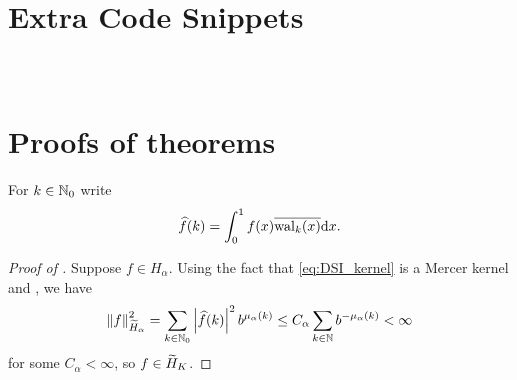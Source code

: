 \documentclass[acmsmall]{acmart}
\begin{document}
\appendix 

\section{Extra Code Snippets} \label{appendix:codes}

\begin{listing}[H]
    \inputminted{python}{snippets/genz_ex_2.txt}
    \caption{Adaptive randomized QMC approximation and error estimation.}
    \label{code:genz_ex_2}
\end{listing}

\begin{listing}[H]
    \inputminted{python}{snippets/dsi_dnet_1.txt}
    \caption{Efficient Gram matrix multiplication and inversion when pairing a digital net with a digitally-shift-invariant kernel.}
    \label{code:dsi_dnet_1}
\end{listing}

\begin{listing}[H]
    \inputminted{python}{snippets/dsi_dnet_2.txt}
    \caption{Efficient FWHT update after doubling the sample size. Code continues from .}
    \label{code:dsi_dnet_2}
\end{listing}

\section{Proofs of theorems} \label{appendix:proofs}

For $k \in {\mathbb{N}}_0$ write
$${\widehat{f}}(k) = \int_0^1 f(x) \overline{\mathrm{wal}_k(x)} \mathrm{d} x.$$

\begin{proof}[Proof of ] 
    Suppose $f \in H_\alpha$. Using the fact that \eqref{eq:DSI_kernel} is a Mercer kernel and \citep[Theorem 14, Remark 19]{dick.decay_walsh_coefficients_smooth_functions}, we have 
    $$\left\lVert f \right\rVert_{{\widetilde{H}}_\alpha}^2 = \sum_{k \in {\mathbb{N}}_0} \left\lvert {\widehat{f}}(k) \right\rvert^2 b^{\mu_\alpha(k)} \leq C_\alpha \sum_{k \in {\mathbb{N}}} b^{-\mu_\alpha(k)} < \infty$$ 
    for some $C_\alpha < \infty$, so $f \in {\widetilde{H}}_K$.
\end{proof}
\end{document}
